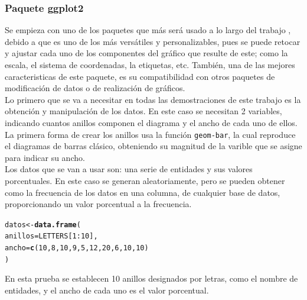\documentclass{article}\usepackage[]{graphicx}\usepackage[]{color}
\makeatletter
\newcommand{\hlnum}[1]{\textcolor[rgb]{0.686,0.059,0.569}{#1}}%
\newcommand{\hlopt}[1]{\textcolor[rgb]{0,0,0}{#1}}%
\newcommand{\hlstd}[1]{\textcolor[rgb]{0.345,0.345,0.345}{#1}}%
\newcommand{\hlkwb}[1]{\textcolor[rgb]{0.69,0.353,0.396}{#1}}%
\newcommand{\hlkwc}[1]{\textcolor[rgb]{0.333,0.667,0.333}{#1}}%
\newcommand{\hlkwd}[1]{\textcolor[rgb]{0.737,0.353,0.396}{\textbf{#1}}}%
\newenvironment{kframe}{%
 \def\at@end@of@kframe{}%
 \ifinner\ifhmode%
  \def\at@end@of@kframe{\end{minipage}}%
  \begin{minipage}{\columnwidth}%
 \fi\fi%
 \def\FrameCommand##1{\hskip\@totalleftmargin \hskip-\fboxsep
 \colorbox{shadecolor}{##1}\hskip-\fboxsep
     \hskip-\linewidth \hskip-\@totalleftmargin \hskip\columnwidth}%
 \MakeFramed {\advance\hsize-\width
   \@totalleftmargin\z@ \linewidth\hsize
   \@setminipage}}%
 {\par\unskip\endMakeFramed%
 \at@end@of@kframe}
\newenvironment{knitrout}{}{} %
\makeatother
\begin{document}
\subsubsection{Paquete ggplot2}
Se empieza con uno de los paquetes que m\'as ser\'a usado a lo largo del trabajo\cite{docu_ggplot2}
, debido a que es uno de los m\'as vers\'atiles y personalizables, pues se puede retocar y ajustar cada uno de los componentes del gr\'afico que resulte de este; como la escala, el sistema de coordenadas, la etiquetas, etc.
Tambi\'en, una de las mejores caracteristicas de este paquete, es su compatibilidad con otros paquetes de modificaci\'on de datos o de realizaci\'on de gr\'aficos.~\\
Lo primero que se va a necesitar en todas las demostraciones de este trabajo es la obtenci\'on y manipulaci\'on de los datos. En este caso se necesitan 2 variables, indicando cuantos anillos componen el diagrama y el ancho de cada uno de ellos.~\\
La primera forma de crear los anillos usa la funci\'on \texttt{geom-bar}, la cual reproduce el diagramas de barras cl\'asico, obteniendo su magnitud de la varible que se asigne para indicar su ancho.~\\Los datos que se van a usar son: una serie de entidades y sus valores porcentuales. En este caso se generan aleatoriamente, pero se pueden obtener como la frecuencia de los datos en una columna, de cualquier base de datos, proporcionando un valor porcentual a la frecuencia.
\begin{knitrout}
\color{fgcolor}\begin{kframe}
\begin{alltt}
\hlstd{datos} \hlkwb{<-} \hlkwd{data.frame}\hlstd{(}
  \hlkwc{anillos}\hlstd{=LETTERS[}\hlnum{1}\hlopt{:}\hlnum{10}\hlstd{],}
  \hlkwc{ancho}\hlstd{=}\hlkwd{c}\hlstd{(}\hlnum{10}\hlstd{,}\hlnum{8}\hlstd{,}\hlnum{10}\hlstd{,}\hlnum{9}\hlstd{,}\hlnum{5}\hlstd{,}\hlnum{12}\hlstd{,}\hlnum{20}\hlstd{,}\hlnum{6}\hlstd{,}\hlnum{10}\hlstd{,}\hlnum{10}\hlstd{)}
\hlstd{)}
\end{alltt}
\end{kframe}
\end{knitrout}
En esta prueba se establecen 10 anillos designados por letras, como el nombre de entidades, y el ancho de cada uno es el valor porcentual.
\end{document}
